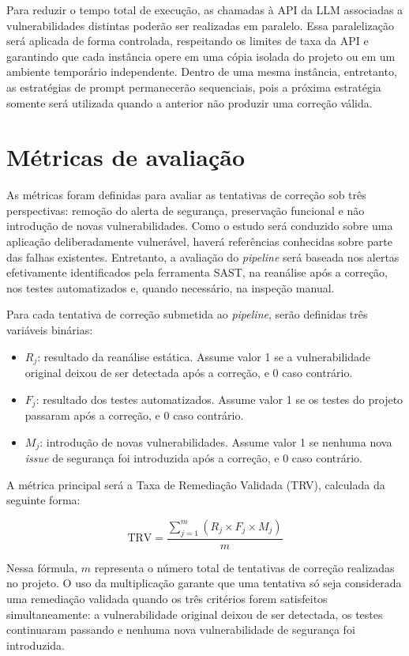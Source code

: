 Para reduzir o tempo total de execução, as chamadas à API da LLM associadas a vulnerabilidades distintas poderão ser realizadas em paralelo. Essa paralelização será aplicada de forma controlada, respeitando os limites de taxa da API e garantindo que cada instância opere em uma cópia isolada do projeto ou em um ambiente temporário independente. Dentro de uma mesma instância, entretanto, as estratégias de prompt permanecerão sequenciais, pois a próxima estratégia somente será utilizada quando a anterior não produzir uma correção válida.

\section{Métricas de avaliação}

As métricas foram definidas para avaliar as tentativas de correção sob três perspectivas: remoção do alerta de segurança, preservação funcional e não introdução de novas vulnerabilidades. Como o estudo será conduzido sobre uma aplicação deliberadamente vulnerável, haverá referências conhecidas sobre parte das falhas existentes. Entretanto, a avaliação do \textit{pipeline} será baseada nos alertas efetivamente identificados pela ferramenta SAST, na reanálise após a correção, nos testes automatizados e, quando necessário, na inspeção manual.

Para cada tentativa de correção submetida ao \textit{pipeline}, serão definidas três variáveis binárias:

\begin{itemize}
    \item $R_j$: resultado da reanálise estática. Assume valor 1 se a vulnerabilidade original deixou de ser detectada após a correção, e 0 caso contrário.
    \item $F_j$: resultado dos testes automatizados. Assume valor 1 se os testes do projeto passaram após a correção, e 0 caso contrário.
    \item $M_j$: introdução de novas vulnerabilidades. Assume valor 1 se nenhuma nova \textit{issue} de segurança foi introduzida após a correção, e 0 caso contrário.
\end{itemize}

A métrica principal será a Taxa de Remediação Validada (TRV), calculada da seguinte forma:

\[
\text{TRV} = \frac{\sum_{j=1}^{m} (R_j \times F_j \times M_j)}{m}
\]

Nessa fórmula, $m$ representa o número total de tentativas de correção realizadas no projeto. O uso da multiplicação garante que uma tentativa só seja considerada uma remediação validada quando os três critérios forem satisfeitos simultaneamente: a vulnerabilidade original deixou de ser detectada, os testes continuaram passando e nenhuma nova vulnerabilidade de segurança foi introduzida.

